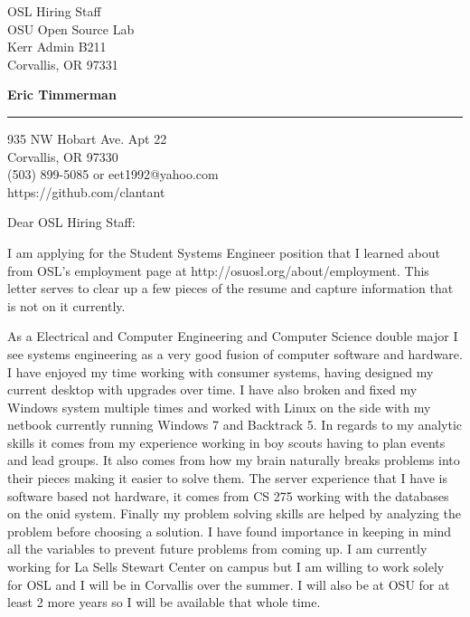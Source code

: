 \documentclass{letter} %
\begin{document}
\signature{Eric Timmerman}           %
\longindentation=0pt                       %
\let\raggedleft\raggedright                %
 
 
\begin{letter}{OSL Hiring Staff \\
OSU Open Source Lab \\
Kerr Admin B211\\
Corvallis, OR 97331}

\begin{center}
{\large\bf Eric Timmerman} 
\end{center}
\medskip\hrule height 1pt
\begin{center}
{935 NW Hobart Ave. Apt 22 \\   Corvallis, OR 97330 \\ (503) 899-5085 or eet1992@yahoo.com \\  https://github.com/clantant} 
\end{center} \vfill %
 
 
\opening{Dear OSL Hiring Staff:} 
 
\noindent I am applying for the Student Systems Engineer position that I learned about from OSL's employment page at http://osuosl.org/about/employment.
This letter serves to clear up a few pieces of the resume and capture information that is not on it currently.
 
\noindent As a Electrical and Computer Engineering and Computer Science double major I see systems engineering as a very good fusion of computer software and hardware. I have enjoyed my time working with consumer systems, having designed my current desktop with upgrades over time. I have also broken and fixed my Windows system multiple times and worked with Linux on the side with my netbook currently running Windows 7 and Backtrack 5. In regards to my analytic skills it comes from my experience working in boy scouts having to plan events and lead groups. It also comes from how my brain naturally breaks problems into their pieces making it easier to solve them. The server experience that I have is software based not hardware, it comes from CS 275 working with the databases on the onid system. Finally my problem solving skills are helped by analyzing the problem before choosing a solution. I have found importance in keeping in mind all the variables to prevent future problems from coming up. I am currently working for La Sells Stewart Center on campus but I am willing to work solely for OSL and I will be in Corvallis over the summer. I will also be at OSU for at least 2 more years so I will be available that whole time.


\end{letter}
\end{document}
